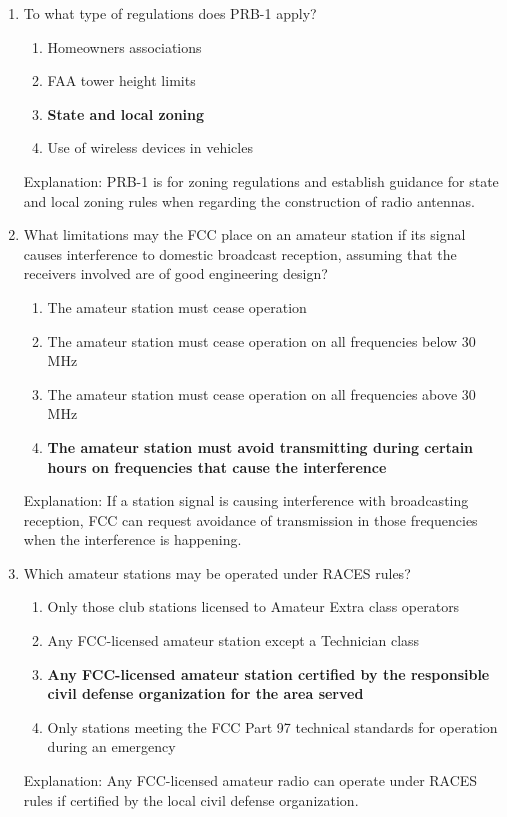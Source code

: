 \begin{enumerate}
    \item To what type of regulations does PRB-1 apply?
      \begin{enumerate}
          \item Homeowners associations
       \item  FAA tower height limits
      \item \textbf {State and local zoning}
       \item  Use of wireless devices in vehicles
        \end{enumerate}
     \textcolor{myred}{Explanation:}
     PRB-1 is for zoning regulations and establish guidance for state and local zoning rules when regarding the construction of radio antennas.
    
       \item What limitations may the FCC place on an amateur station if its signal causes interference to domestic broadcast reception, assuming that the receivers involved are of good engineering design?
      \begin{enumerate}
          \item The amateur station must cease operation
      \item  The amateur station must cease operation on all frequencies below 30 MHz
         \item  The amateur station must cease operation on all frequencies above 30 MHz
      \item \textbf {The amateur station must avoid transmitting during certain hours on frequencies that cause the interference}
      \end{enumerate}
    \textcolor{myred}{Explanation:}
    If a station signal is causing interference with broadcasting reception, FCC can request avoidance of transmission in those frequencies when the interference is happening.
       
      \item Which amateur stations may be operated under RACES rules?
        \begin{enumerate}
          \item Only those club stations licensed to Amateur Extra class operators
       \item  Any FCC-licensed amateur station except a Technician class
     \item \textbf {Any FCC-licensed amateur station certified by the responsible civil defense organization for the area served}
     \item  Only stations meeting the FCC Part 97 technical standards for operation during an emergency
    \end{enumerate}
    \textcolor{myred}{Explanation:}
    Any FCC-licensed amateur radio can operate under RACES rules if certified by the local civil defense organization.
     

\end{enumerate}
